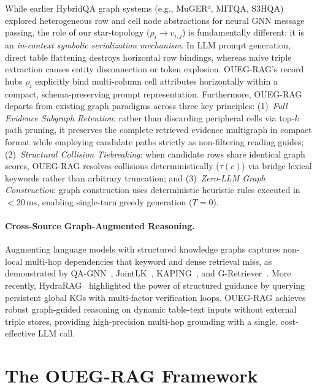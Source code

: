 \documentclass[runningheads]{llncs}
\begin{document}
While earlier HybridQA graph systems (e.g., MuGER², MITQA, S3HQA) explored heterogeneous row and cell node abstractions for neural GNN message passing, the role of our star-topology ($\rho_i \rightarrow v_{i,j}$) is fundamentally different: it is an \emph{in-context symbolic serialization mechanism}. In LLM prompt generation, direct table flattening destroys horizontal row bindings, whereas naive triple extraction causes entity disconnection or token explosion. OUEG-RAG's record hubs $\rho_i$ explicitly bind multi-column cell attributes horizontally within a compact, schema-preserving prompt representation. Furthermore, OUEG-RAG departs from existing graph paradigms across three key principles: (1)~\emph{Full Evidence Subgraph Retention}: rather than discarding peripheral cells via top-$k$ path pruning, it preserves the complete retrieved evidence multigraph in compact format while employing candidate paths strictly as non-filtering reading guides; (2)~\emph{Structural Collision Tiebreaking}: when candidate rows share identical graph scores, OUEG-RAG resolves collisions deterministically ($\tau(c)$) via bridge lexical keywords rather than arbitrary truncation; and (3)~\emph{Zero-LLM Graph Construction}: graph construction uses deterministic heuristic rules executed in $<20$\,ms, enabling single-turn greedy generation ($T=0$).

\paragraph{Cross-Source Graph-Augmented Reasoning.}
Augmenting language models with structured knowledge graphs captures non-local multi-hop dependencies that keyword and dense retrieval miss, as demonstrated by QA-GNN~\cite{yasunaga2021qagnn}, JointLK~\cite{sun2022jointlk}, KAPING~\cite{baek2023kaped}, and G-Retriever~\cite{he2024gretriever}. More recently, HydraRAG~\cite{tan2025hydrarag} highlighted the power of structured guidance by querying persistent global KGs with multi-factor verification loops. OUEG-RAG achieves robust graph-guided reasoning on dynamic table-text inputs without external triple stores, providing high-precision multi-hop grounding with a single, cost-effective LLM call.

\section{The OUEG-RAG Framework}
\label{sec:method}
\label{sec:problem}
\end{document}
